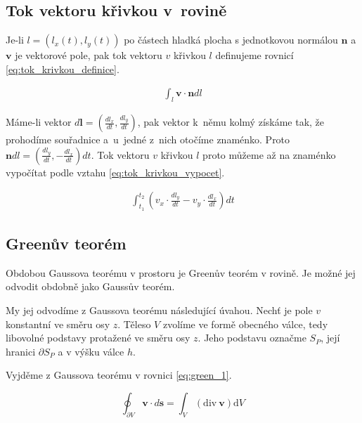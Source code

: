 \documentclass{book}
\newcommand{\vect}[1]{\boldsymbol{#1}}
\newcommand{\diverg}{\mathrm{div}}
\begin{document}
\subsection{Tok vektoru křivkou v~rovině}

Je-li \(l = \left(l_x(t), l_y(t)\right)\) po částech hladká plocha s jednotkovou normálou \(\vect{n}\) a \(\vect{v}\) je vektorové pole,
pak tok vektoru \(v\) křivkou \(l\) definujeme rovnicí \eqref{eq:tok_krivkou_definice}.

\begin{equation}
\label{eq:tok_krivkou_definice}
\begin{split}
\int_l \vect{v} \cdot \vect{n} dl
\end{split}
\end{equation}

Máme-li vektor \(d \vect{l} = \left(\frac{d l_x}{dt}, \frac{d l_y}{dt}\right)\), pak vektor k~němu kolmý získáme tak, že prohodíme souřadnice a~u~jedné z~nich otočíme znaménko. Proto \(\vect{n} dl = \left(\frac{d l_y}{dt}, -\frac{d l_x}{dt}\right) dt\). Tok vektoru \(v\) křivkou \(l\) proto můžeme až na znaménko vypočítat podle vztahu \eqref{eq:tok_krivkou_vypocet}.

\begin{equation}
\label{eq:tok_krivkou_vypocet}
\begin{split}
\int_{t_1}^{t_2} \left (v_x \cdot \frac{d l_y}{dt} -v_y \cdot \frac{d l_x}{dt} \right) dt
\end{split}
\end{equation}

\subsection{Greenův teorém}

Obdobou Gaussova teorému v prostoru je Greenův teorém v rovině. Je možné jej odvodit obdobně jako Gaussův teorém.

My jej odvodíme z Gaussova teorému následující úvahou. Nechť je pole \(v\) konstantní ve směru osy \(z\). Těleso \(V\) zvolíme ve formě obecného válce, tedy libovolné podstavy protažené ve směru osy \(z\). Jeho podstavu označme \(S_P\), její hranici \(\partial S_P\) a v výšku válce \(h\).

Vyjděme z Gaussova teorému v rovnici \eqref{eq:green_1}.

\begin{equation}
\label{eq:green_1}
\oint_{\partial V} \vect{v} \cdot d\vect{s} = \int_V \left(\diverg \ \vect{v} \right) \mathrm{d}V
\end{equation}
\end{document}
